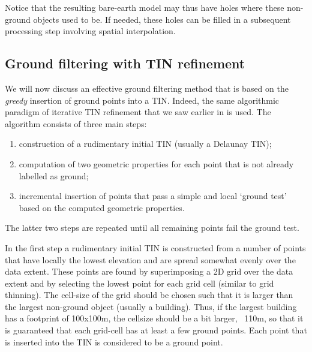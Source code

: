 Notice that the resulting bare-earth model may thus have holes where these non-ground objects used to be.
If needed, these holes can be filled in a subsequent processing step involving spatial interpolation.

\subsection{Ground filtering with TIN refinement}
We will now discuss an effective ground filtering method that is based on the \emph{greedy} insertion of ground points into a TIN\@.
Indeed, the same algorithmic paradigm of iterative TIN refinement that we saw earlier in  is used.
The algorithm consists of three main steps:
\begin{enumerate}
  \item construction of a rudimentary initial TIN (usually a Delaunay TIN);
  \item computation of two geometric properties for each point that is not already labelled as ground;
  \item incremental insertion of points that pass a simple and local `ground test' based on the computed geometric properties.
\end{enumerate}
The latter two steps are repeated until all remaining points fail the ground test.

In the first step a rudimentary initial TIN is constructed from a number of points that have locally the lowest elevation and are spread somewhat evenly over the data extent.
These points are found by superimposing a 2D grid over the data extent and by selecting the lowest point for each grid cell (similar to grid thinning).
The cell-size of the grid should be chosen such that it is larger than the largest non-ground object (usually a building).
Thus, if the largest building has a footprint of 100x100m, the cellsize should be a bit larger, \eg\ 110m, so that it is guaranteed that each grid-cell has at least a few ground points.
Each point that is inserted into the TIN is considered to be a ground point.

